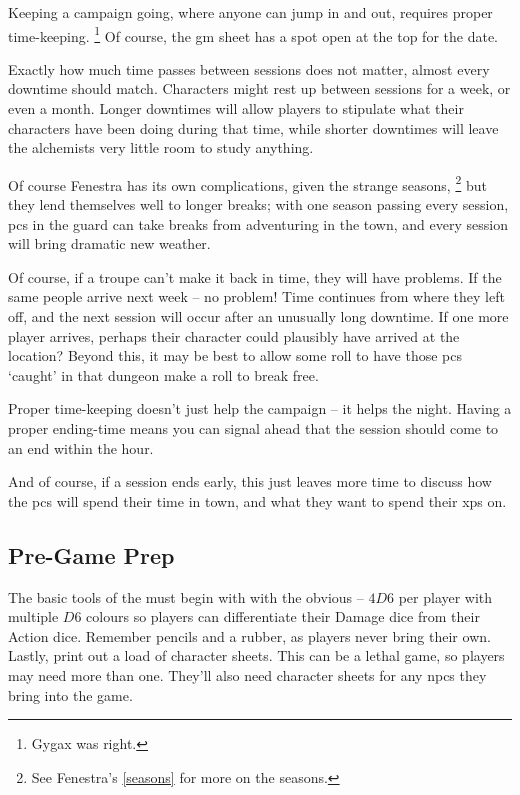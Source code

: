 \begin{multicols}{2}
Keeping a campaign going, where anyone can jump in and out, requires proper time-keeping.%
\footnote{Gygax was right.}
Of course, the \gls{gm} sheet has a spot open at the top for the date.

Exactly how much time passes between sessions does not matter, almost every downtime should match.
Characters might rest up between sessions for a week, or even a month.
Longer downtimes will allow players to stipulate what their characters have been doing during that time, while shorter downtimes will leave the alchemists very little room to study anything.

  Of course Fenestra has its own complications, given the strange seasons,%
  \footnote{See Fenestra's \autoref{seasons} for more on the seasons.}
  but they lend themselves well to longer breaks; with one season passing every session, \glspl{pc} in the \gls{guard} can take breaks from adventuring in the town, and every session will bring dramatic new weather.

Of course, if a troupe can't make it back in time, they will have problems.
If the same people arrive next week -- no problem!
Time continues from where they left off, and the next session will occur after an unusually long downtime.
If one more player arrives, perhaps their character could plausibly have arrived at the location?
Beyond this, it may be best to allow some roll to have those \glspl{pc} `caught' in that dungeon make a roll to break free.

Proper time-keeping doesn't just help the campaign -- it helps the night.
Having a proper ending-time means you can signal ahead that the session should come to an end within the hour.

And of course, if a session ends early, this just leaves more time to discuss how the \glspl{pc} will spend their time in town, and what they want to spend their \glspl{xp} on.

\subsection{Pre-Game Prep}

The basic tools of the  must begin with with the obvious -- $4D6$ per player with multiple $D6$ colours so players can differentiate their Damage dice from their Action dice.
Remember pencils and a rubber, as players never bring their own.
Lastly, print out a load of character sheets.
This can be a lethal game, so players may need more than one.
They'll also need character sheets for any \glspl{npc} they bring into the game.


\end{multicols}
